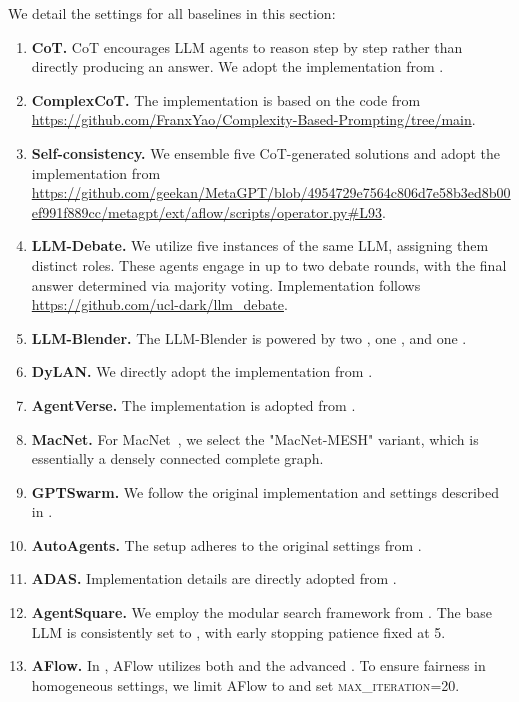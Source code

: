 \documentclass{article}
\theoremstyle{plain}
\theoremstyle{definition}
\theoremstyle{remark}
\newcommand{\llmname}[1]{{\fontfamily{pcr}\selectfont {#1}}\xspace}
\begin{document}
We detail the settings for all baselines in this section:  
\begin{enumerate}  
    \item \textbf{CoT.} CoT encourages LLM agents to reason step by step rather than directly producing an answer. We adopt the implementation from \cite{zhang2022automaticcot}.  

    \item \textbf{ComplexCoT.} The implementation is based on the code from \url{https://github.com/FranxYao/Complexity-Based-Prompting/tree/main}.  

    \item \textbf{Self-consistency.} We ensemble five CoT-generated solutions and adopt the implementation from \url{https://github.com/geekan/MetaGPT/blob/4954729e7564c806d7e58b3ed8b00ef991f889cc/metagpt/ext/aflow/scripts/operator.py#L93}.  

    \item \textbf{LLM-Debate.} We utilize five instances of the same LLM, assigning them distinct roles. These agents engage in up to two debate rounds, with the final answer determined via majority voting. Implementation follows \url{https://github.com/ucl-dark/llm_debate}.  

    \item \textbf{LLM-Blender.} The LLM-Blender is powered by two \llmname{gpt-4o-mini}, one \llmname{Qwen-2.5-72b}, and one \llmname{llama-3.1-70b}.  

    \item \textbf{DyLAN.} We directly adopt the implementation from \cite{arXiv2023_Dynamic-LLM-Agent}.  

    \item \textbf{AgentVerse.} The implementation is adopted from \cite{chen2023agentverse}.  

    \item \textbf{MacNet.} For MacNet~\citep{qian2024scaling}, we select the "MacNet-MESH" variant, which is essentially a densely connected complete graph.  

    \item \textbf{GPTSwarm.} We follow the original implementation and settings described in \cite{zhuge2024gptswarm}.  

    \item \textbf{AutoAgents.} The setup adheres to the original settings from \cite{chen2023autoagents}.  

    \item \textbf{ADAS.} Implementation details are directly adopted from \cite{hu2024adas}.  

    \item \textbf{AgentSquare.} We employ the modular search framework from \cite{shang2024agentsquare}. The base LLM is consistently set to \llmname{gpt-4o-mini}, with early stopping patience fixed at 5.  

    \item \textbf{AFlow.} In \cite{zhang2024aflow}, AFlow utilizes both \llmname{gpt-4o-mini} and the advanced \llmname{claude-3.5-sonnet}. To ensure fairness in homogeneous settings, we limit AFlow to \llmname{gpt-4o-mini} and set \textsc{max\_iteration}=20.  
\end{enumerate}  
\end{document}
